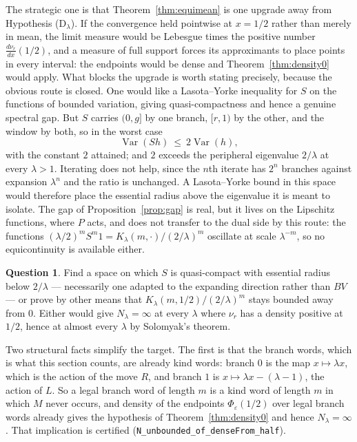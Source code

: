 \documentclass[11pt,reqno]{amsart}
\theoremstyle{plain}
\theoremstyle{definition}
\newtheorem{question}[theorem]{Question}
\theoremstyle{remark}
\begin{document}
The strategic one is that Theorem~\ref{thm:equimean} is one upgrade away from
Hypothesis (D$_\lambda$). If the convergence held pointwise at $x=1/2$ rather
than merely in mean, the limit measure would be Lebesgue times the positive
number $\tfrac{d\nu_r}{dx}(1/2)$, and a measure of full support forces its
approximants to place points in every interval: the endpoints would be dense
and Theorem~\ref{thm:density0} would apply. What blocks the upgrade is worth stating precisely, because the obvious route
is closed. One would like a Lasota--Yorke inequality for $S$ on the functions
of bounded variation, giving quasi-compactness and hence a genuine spectral
gap. But $S$ carries $(0,g]$ by one branch, $[r,1)$ by the other, and the
window by both, so in the worst case
\[
  \operatorname{Var}(Sh)\ \leq\ 2\operatorname{Var}(h),
\]
with the constant $2$ attained; and $2$ exceeds the peripheral eigenvalue
$2/\lambda$ at every $\lambda>1$. Iterating does not help, since the $n$th
iterate has $2^n$ branches against expansion $\lambda^n$ and the ratio is
unchanged. A Lasota--Yorke bound in this space would therefore place the
essential radius above the eigenvalue it is meant to isolate. The gap of
Proposition~\ref{prop:gap} is real, but it lives on the Lipschitz functions,
where $P$ acts, and does not transfer to the dual side by this route: the
functions $(\lambda/2)^mS^m1=K_\lambda(m,\cdot)/(2/\lambda)^m$ oscillate at
scale $\lambda^{-m}$, so no equicontinuity is available either.

\begin{question}\label{q:LY}
Find a space on which $S$ is quasi-compact with essential radius below
$2/\lambda$ --- necessarily one adapted to the expanding direction rather than
$BV$ --- or prove by other means that
$K_\lambda(m,1/2)/(2/\lambda)^m$ stays bounded away from $0$. Either would
give $N_\lambda=\infty$ at every $\lambda$ where $\nu_r$ has a density
positive at $1/2$, hence at almost every $\lambda$ by Solomyak's theorem.
\end{question}

Two structural facts simplify the target. The first is that the branch words,
which is what this section counts, are already kind words: branch $0$ is the
map $x\mapsto\lambda x$, which is the action of the move $R$, and branch $1$
is $x\mapsto\lambda x-(\lambda-1)$, the action of $L$. So a legal branch word
of length $m$ is a kind word of length $m$ in which $M$ never occurs, and
density of the endpoints $\Phi_\varepsilon(1/2)$ over legal branch words
already gives the hypothesis of Theorem~\ref{thm:density0} and hence
$N_\lambda=\infty$. That implication is certified
(\texttt{N\_unbounded\_of\_denseFrom\_half}).
\end{document}

